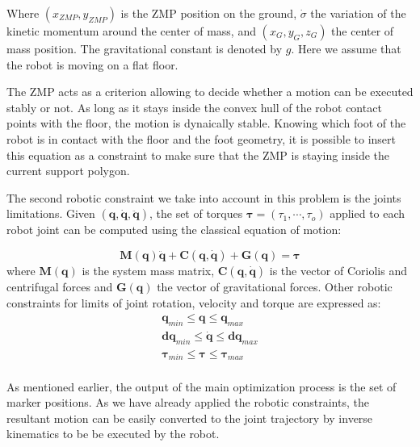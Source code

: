 \documentclass[letterpaper, 10 pt, conference]{ieeeconf}  %
\begin{document}
Where $(x_{ZMP}, y_{ZMP})$ is the ZMP position on the
ground, $\dot{\sigma}$ the variation of the kinetic momentum around
the center of mass, and $(x_G, y_G, z_G)$ the center of mass
position. The gravitational constant is denoted by $g$.
Here we assume that the robot is moving on a flat floor.

The ZMP acts as a criterion allowing to decide whether a motion can be
executed stably or not. As long as it stays inside the convex hull of the
robot contact points with the floor, the motion is dynaically stable.
Knowing which foot of the robot is in contact with the floor and the
foot geometry, it is possible to insert this equation as a constraint
to make sure that the ZMP is staying inside the current support polygon.

The second robotic constraint we take into account in this problem
is the joints limitations. Given $(\mathbf{q}, \dot{\mathbf{q}},
\ddot{\mathbf{q}})$, %
the set of torques  $\mathbf{\tau} = (\tau_1, \cdots, \tau_o)$
applied to each robot joint can be computed using the classical
equation of motion: 

\begin{equation}
  \mathbf{M}(\mathbf{q}) \ddot{\mathbf{q}} + \mathbf{C}(\mathbf{q},
  \dot{\mathbf{q}}) + \mathbf{G}(\mathbf{q}) = \mathbf{\tau}
\end{equation}
where $\mathbf{M}(\mathbf{q})$ is the system mass matrix,
$\mathbf{C}(\mathbf{q}, \dot{\mathbf{q}})$ is the vector of Coriolis
and centrifugal forces and $\mathbf{G}(\mathbf{q})$ the vector of
gravitational forces.
Other robotic constraints for limits of joint rotation, velocity and
torque are expressed as:
\begin{equation}
  \begin{array}{ccc}
    \mathbf{q}_{min} \leq \mathbf{q} \leq \mathbf{q}_{max} \\
    \mathbf{dq}_{min} \leq \dot{\mathbf{q}} \leq \mathbf{dq}_{max} \\
    \mathbf{\tau}_{min} \leq \mathbf{\tau} \leq \mathbf{\tau}_{max} \\
    \end{array}
\end{equation}

As mentioned earlier, the output of the main optimization process is
the set of marker positions. As we have already applied the robotic
constraints, the resultant motion can be easily converted to the 
joint trajectory by inverse kinematics to be be executed by 
the robot. 
\end{document}
